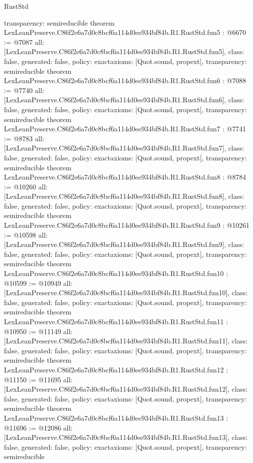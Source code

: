 \begin{lexlean}{RustStd}
\begin{coremodule}
{  transparency: semireducible
}
theorem LexLeanPreserve.C86f2e6a7d0c8bcf6a114d0ee934bf84b.R1.RustStd.fun5 : @6670 := @7087 {
  all: [LexLeanPreserve.C86f2e6a7d0c8bcf6a114d0ee934bf84b.R1.RustStd.fun5],
  class: false,
  generated: false,
  policy: exact{axioms: [Quot.sound, propext]},
  transparency: semireducible
}
theorem LexLeanPreserve.C86f2e6a7d0c8bcf6a114d0ee934bf84b.R1.RustStd.fun6 : @7088 := @7740 {
  all: [LexLeanPreserve.C86f2e6a7d0c8bcf6a114d0ee934bf84b.R1.RustStd.fun6],
  class: false,
  generated: false,
  policy: exact{axioms: [Quot.sound, propext]},
  transparency: semireducible
}
theorem LexLeanPreserve.C86f2e6a7d0c8bcf6a114d0ee934bf84b.R1.RustStd.fun7 : @7741 := @8783 {
  all: [LexLeanPreserve.C86f2e6a7d0c8bcf6a114d0ee934bf84b.R1.RustStd.fun7],
  class: false,
  generated: false,
  policy: exact{axioms: [Quot.sound, propext]},
  transparency: semireducible
}
theorem LexLeanPreserve.C86f2e6a7d0c8bcf6a114d0ee934bf84b.R1.RustStd.fun8 : @8784 := @10260 {
  all: [LexLeanPreserve.C86f2e6a7d0c8bcf6a114d0ee934bf84b.R1.RustStd.fun8],
  class: false,
  generated: false,
  policy: exact{axioms: [Quot.sound, propext]},
  transparency: semireducible
}
theorem LexLeanPreserve.C86f2e6a7d0c8bcf6a114d0ee934bf84b.R1.RustStd.fun9 : @10261 := @10598 {
  all: [LexLeanPreserve.C86f2e6a7d0c8bcf6a114d0ee934bf84b.R1.RustStd.fun9],
  class: false,
  generated: false,
  policy: exact{axioms: [Quot.sound, propext]},
  transparency: semireducible
}
theorem LexLeanPreserve.C86f2e6a7d0c8bcf6a114d0ee934bf84b.R1.RustStd.fun10 : @10599 := @10949 {
  all: [LexLeanPreserve.C86f2e6a7d0c8bcf6a114d0ee934bf84b.R1.RustStd.fun10],
  class: false,
  generated: false,
  policy: exact{axioms: [Quot.sound, propext]},
  transparency: semireducible
}
theorem LexLeanPreserve.C86f2e6a7d0c8bcf6a114d0ee934bf84b.R1.RustStd.fun11 : @10950 := @11149 {
  all: [LexLeanPreserve.C86f2e6a7d0c8bcf6a114d0ee934bf84b.R1.RustStd.fun11],
  class: false,
  generated: false,
  policy: exact{axioms: [Quot.sound, propext]},
  transparency: semireducible
}
theorem LexLeanPreserve.C86f2e6a7d0c8bcf6a114d0ee934bf84b.R1.RustStd.fun12 : @11150 := @11695 {
  all: [LexLeanPreserve.C86f2e6a7d0c8bcf6a114d0ee934bf84b.R1.RustStd.fun12],
  class: false,
  generated: false,
  policy: exact{axioms: [Quot.sound, propext]},
  transparency: semireducible
}
theorem LexLeanPreserve.C86f2e6a7d0c8bcf6a114d0ee934bf84b.R1.RustStd.fun13 : @11696 := @12086 {
  all: [LexLeanPreserve.C86f2e6a7d0c8bcf6a114d0ee934bf84b.R1.RustStd.fun13],
  class: false,
  generated: false,
  policy: exact{axioms: [Quot.sound, propext]},
  transparency: semireducible
}
\end{coremodule}
\end{lexlean}
